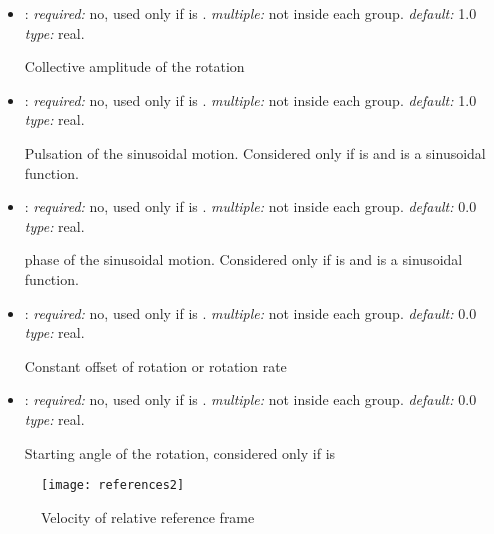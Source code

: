\begin{itemize}
\begin{itemize}
    \item {}: \textit{required:} no, used only if  
    is . \textit{multiple:} not inside each  group. 
    \textit{default:} 1.0 \textit{type:} real.
    
    Collective amplitude of the rotation 
    
    \item {}: \textit{required:} no, used only if  
    is . \textit{multiple:} not inside each  group. 
    \textit{default:} 1.0 \textit{type:} real.
    
    Pulsation of the sinusoidal motion. Considered only if  is 
     and  is a sinusoidal function.
    
        \item {}: \textit{required:} no, used only if 
         is . \textit{multiple:} not 
        inside each  group. \textit{default:} 0.0 \textit{type:} real.
    
    phase of the sinusoidal motion. Considered only if  is 
     and  is a sinusoidal function.
    
    \item {}: \textit{required:} no, used only if  
    is . \textit{multiple:} not inside each  group. 
    \textit{default:} 0.0 \textit{type:} real.
    
    Constant offset of rotation or rotation rate
    
    \item {}: \textit{required:} no, used only if  
    is . \textit{multiple:} not inside each  group. 
    \textit{default:} 0.0 \textit{type:} real.
    
    Starting angle of the rotation, considered only if  is 
    
	\end{itemize}

\end{itemize}

\begin{figure}
\centering
\texttt{[image: references2]}
\caption{Velocity of relative reference frame}
\label{fig:references2}
\end{figure}

